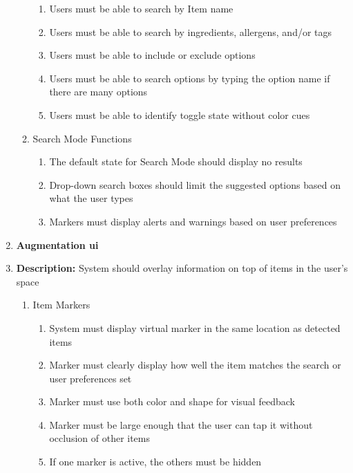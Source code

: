 \documentclass[thesis]{fputhesis}
\begin{document}
\begin{body}
\begin{enumerate}
\begin{enumerate}
        \begin{enumerate}
            \item[\textbullet] Users must be able to search by Item name
            \item[\textbullet] Users must be able to search by ingredients, allergens, and/or tags
            \item[\textbullet] Users must be able to include or exclude options
            \item[\textbullet] Users must be able to search options by typing the option name if there are many options
            \item[\textbullet] Users must be able to identify toggle state without color cues
        \end{enumerate}
        \item[\textbullet] Search Mode Functions
        \begin{enumerate}
            \item[\textbullet] The default state for Search Mode should display no results
            \item[\textbullet] Drop-down search boxes should limit the suggested options based on what the user types
            \item[\textbullet] Markers must display alerts and warnings based on user preferences            
        \end{enumerate}
    \end{enumerate}
    \item \textbf{Augmentation \acrshort{ui}}
    \item[] \textbf{Description:} System should overlay information on top of items in the user's space
    \begin{enumerate}
        \item[\textbullet] Item Markers
        \begin{enumerate}
            \item[\textbullet] System must display virtual marker in the same location as detected items
            \item[\textbullet] Marker must clearly display how well the item matches the search or user preferences set
            \item[\textbullet] Marker must use both color and shape for visual feedback
            \item[\textbullet] Marker must be large enough that the user can tap it without occlusion of other items
            \item[\textbullet] If one marker is active, the others must be hidden

\end{enumerate}
\end{enumerate}
\end{enumerate}
\end{body}
\end{document}
